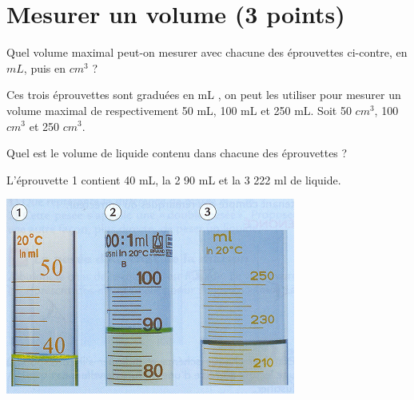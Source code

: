 \section{Mesurer un volume (3 points)}\label{ex:temperture}


\begin{questions}
	
	\begin{multicols}{2}
		
	
		\question[2] Quel volume maximal peut-on mesurer avec chacune des éprouvettes ci-contre, en $mL$, puis en $cm^3$ ?
		
		\begin{solution}
			Ces trois éprouvettes sont graduées en mL , on peut les utiliser pour mesurer un volume maximal de respectivement 50 mL, 100 mL et 250 mL. Soit 50 $cm^3$, 100 $cm^3$ et 250 $cm^3$.
		\end{solution}
		
		\question[1]	Quel est le volume de liquide contenu dans chacune des éprouvettes ?
		
		\begin{solution}
			L'éprouvette 1 contient 40 mL, la 2 90 mL et la 3 222 ml de liquide.
		\end{solution}
		
		\begin{center}
			
		\includegraphics[scale=0.85]{img/mesure1}
		\end{center}
		
	\end{multicols}
	
\end{questions}